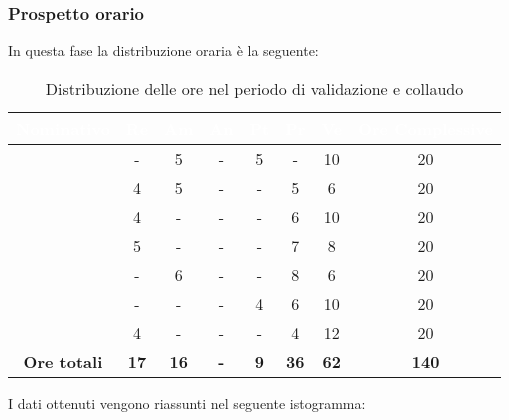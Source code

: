 \subsubsection{Prospetto orario}
In questa fase la distribuzione oraria è la seguente:
\begin{table}[H]
	\begin{center}
		\begin{tabular}{ |c c c c c c c c| }
		\rowcolor{darkblue} 
		\textcolor{white}{\textbf{Nominativo}} & \textcolor{white}{\textbf{Re}} & \textcolor{white}{\textbf{Am}} & \textcolor{white}{\textbf{An}} & \textcolor{white}{\textbf{Pt}} & \textcolor{white}{\textbf{Pr}} & \textcolor{white}{\textbf{Ve}} & \textcolor{white}{\textbf{Ore Complessive}} \\ \hline
		\BL 	& -  	& 5  	& - 	& 5 	& - 	& 10 	& 20 \\ \hline
		\FF 	& 4  	& 5  	& - 	& - 	& 5 	& 6  	& 20 \\ \hline
		\MM 	& 4 	& - 	& - 	& - 	& 6 	& 10  	& 20 \\ \hline
		\PC 	& 5 	& -  	& - 	& - 	& 7 	& 8 	& 20 \\ \hline
		\TG 	& -  	& 6 	& - 	& - 	& 8 	& 6 	& 20 \\ \hline
		\TL 	& -  	& - 	& - 	& 4 	& 6 	& 10 	& 20 \\ \hline
		\VD 	& 4  	& -  	& - 	& - 	& 4 	& 12  	& 20 \\ \hline
		\textbf{Ore totali} & \textbf{17} & \textbf{16} & \textbf{-} & \textbf{9} & \textbf{36} & \textbf{62} & \textbf{140} \\ \hline
		\end{tabular}
	\caption{Distribuzione delle ore nel periodo di validazione e collaudo}
	\end{center}
\end{table}
I dati ottenuti vengono riassunti nel seguente istogramma:
